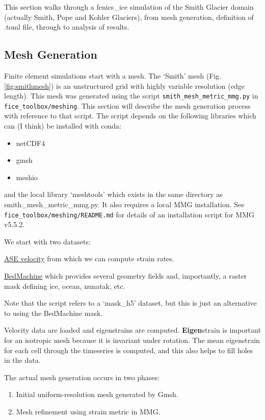 \documentclass[11pt, reqno, nocenter]{article}
\begin{document}
This section walks through a fenics\_ice simulation of the Smith Glacier domain (actually Smith, Pope and Kohler Glaciers), from mesh generation, definition of .toml file, through to analysis of results.

\subsection{Mesh Generation}

Finite element simulations start with a mesh.
The `Smith' mesh (Fig. \ref{fig:smithmesh}) is an unstructured grid with highly variable resolution (edge length).
This mesh was generated using the script {\tt smith\_mesh\_metric\_mmg.py} in {\tt fice\_toolbox/meshing}.
This section will describe the mesh generation process with reference to that script.
The script depends on the following libraries which can (I think) be installed with conda:
\begin{itemize}
\item netCDF4
\item gmsh
\item meshio
\end{itemize}

and the local library `meshtools' which exists in the same directory as smith\_mesh\_metric\_mmg.py.
It also requires a local MMG installation. See {\tt fice\_toolbox/meshing/README.md} for details of an installation script for MMG v5.5.2.

We start with two datasets:

\href{https://nsidc.org/data/nsidc-0545}{ASE velocity} from which we can compute strain rates.

\href{https://nsidc.org/data/NSIDC-0756/versions/1}{BedMachine} which provides several geometry fields and, importantly, a raster mask defining ice, ocean, nunatak, etc.

Note that the script refers to a `mask\_h5' dataset, but this is just an alternative to using the BedMachine mask.

Velocity data are loaded and eigenstrains are computed. \textbf{Eigen}strain is important for an isotropic mesh because it is invariant under rotation. The mean eigenstrain for each cell through the timeseries is computed, and this also helps to fill holes in the data.

The actual mesh generation occurs in two phases:
\begin{enumerate}
\item Initial uniform-resolution mesh generated by Gmsh.
\item Mesh refinement using strain metric in MMG.
\end{enumerate}
\end{document}
